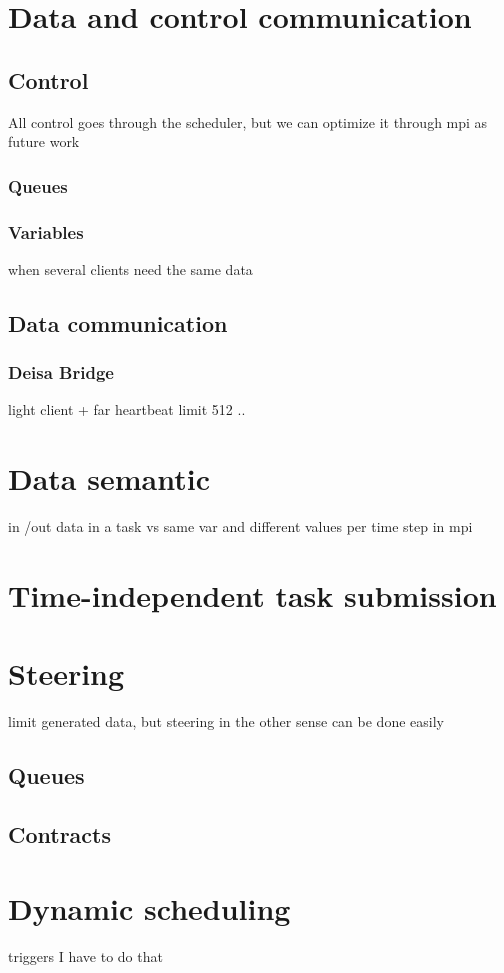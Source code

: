 \section{Data and control communication}
\subsection{Control}
All control goes through the scheduler, but we can optimize it through mpi as future work 
\subsubsection{Queues} 

\subsubsection{Variables}
when several clients need the same data 

\subsection{Data communication}
\subsubsection{Deisa Bridge}
light client + far heartbeat 
limit 512 ..

\section{Data semantic}
in /out  data in a task vs same var and different values per time step in mpi

\section{Time-independent task submission}

\section{Steering}
limit generated data, but steering in the other sense can be done easily  
\subsection{Queues}
\subsection{Contracts}
\section{Dynamic scheduling}
triggers I have to do that 


